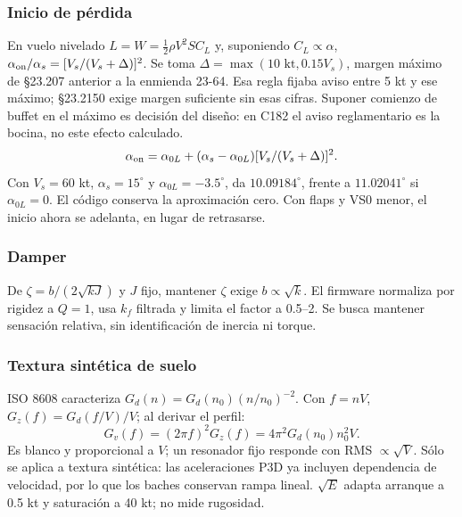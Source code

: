 \documentclass[11pt,a4paper]{article}
\begin{document}
\subsubsection{Inicio de pérdida}
En vuelo nivelado $L=W=\tfrac12\rho V^2SC_L$ y, suponiendo $C_L\propto\alpha$, $\alpha_{\rm on}/\alpha_s=[V_s/(V_s+\Delta)]^2$. Se toma $\Delta=\max(10\text{ kt},0.15V_s)$, margen máximo de §23.207 anterior a la enmienda 23-64. Esa regla fijaba aviso entre 5 kt y ese máximo; §23.2150 exige margen suficiente sin esas cifras. Suponer comienzo de buffet en el máximo es decisión del diseño: en C182 el aviso reglamentario es la bocina, no este efecto calculado.
\begin{equation}\alpha_{\rm on}=\alpha_{0L}+(\alpha_s-\alpha_{0L})[V_s/(V_s+\Delta)]^2.\end{equation}
Con $V_s=60$ kt, $\alpha_s=15^\circ$ y $\alpha_{0L}=-3.5^\circ$, da $10.09184^\circ$, frente a $11.02041^\circ$ si $\alpha_{0L}=0$. El código conserva la aproximación cero. Con flaps y VS0 menor, el inicio ahora se adelanta, en lugar de retrasarse.



\subsubsection{Damper}
De $\zeta=b/(2\sqrt{kJ})$ y $J$ fijo, mantener $\zeta$ exige $b\propto\sqrt k$. El firmware normaliza por rigidez a $Q=1$, usa $k_f$ filtrada y limita el factor a 0.5--2. Se busca mantener sensación relativa, sin identificación de inercia ni torque.



\subsubsection{Textura sintética de suelo}
ISO 8608 caracteriza $G_d(n)=G_d(n_0)(n/n_0)^{-2}$. Con $f=nV$, $G_z(f)=G_d(f/V)/V$; al derivar el perfil:
\begin{equation}G_v(f)=(2\pi f)^2G_z(f)=4\pi^2G_d(n_0)n_0^2V.\end{equation}
Es blanco y proporcional a $V$; un resonador fijo responde con RMS $\propto\sqrt V$. Sólo se aplica a textura sintética: las aceleraciones P3D ya incluyen dependencia de velocidad, por lo que los baches conservan rampa lineal. $\sqrt E$ adapta arranque a 0.5 kt y saturación a 40 kt; no mide rugosidad.
\end{document}
